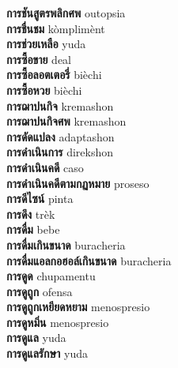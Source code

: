 \textbf{ การชันสูตรพลิกศพ  } outopsia \\
\textbf{ การชื่นชม  } kòmplimènt \\
\textbf{ การช่วยเหลือ  } yuda \\
\textbf{ การซื้อขาย  } deal \\
\textbf{ การซื้อลอตเตอรี่  } bièchi \\
\textbf{ การซื้อหวย  } bièchi \\
\textbf{ การฌาปนกิจ  } kremashon \\
\textbf{ การฌาปนกิจศพ  } kremashon \\
\textbf{ การดัดแปลง  } adaptashon \\
\textbf{ การดำเนินการ  } direkshon \\
\textbf{ การดำเนินคดี  } caso \\
\textbf{ การดำเนินคดีตามกฏหมาย  } proseso \\
\textbf{ การดีไซน์  } pinta \\
\textbf{ การดึง  } trèk \\
\textbf{ การดื่ม  } bebe \\
\textbf{ การดื่มเกินขนาด  } buracheria \\
\textbf{ การดื่มแอลกอฮอล์เกินขนาด  } buracheria \\
\textbf{ การดูด  } chupamentu \\
\textbf{ การดูถูก  } ofensa \\
\textbf{ การดูถูกเหยียดหยาม  } menospresio \\
\textbf{ การดูหมิ่น  } menospresio \\
\textbf{ การดูแล  } yuda \\
\textbf{ การดูแลรักษา  } yuda \\
